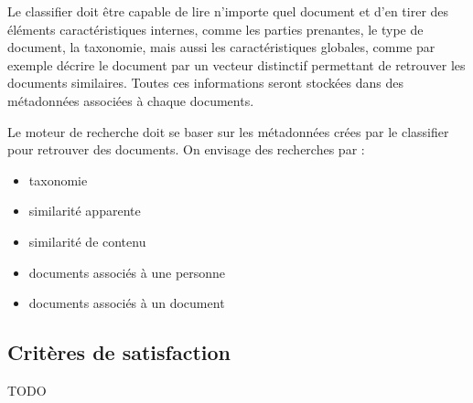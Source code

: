Le classifier doit être capable de lire n'importe quel document et d'en tirer des éléments caractéristiques internes, comme les parties prenantes, le type de document, la taxonomie, mais aussi les caractéristiques globales, comme par exemple décrire le document par un vecteur distinctif permettant de retrouver les documents similaires.
Toutes ces informations seront stockées dans des métadonnées associées à chaque documents.


Le moteur de recherche doit se baser sur les métadonnées crées par le classifier pour retrouver des documents.
On envisage des recherches par :
\begin {itemize}
\item taxonomie
\item similarité apparente
\item similarité de contenu
\item documents associés à une personne
\item documents associés à un document
\end {itemize}


\subsection {Critères de satisfaction}

TODO








